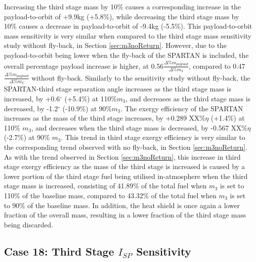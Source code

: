 Increasing the third stage mass by 10\% causes a corresponding increase in the payload-to-orbit of +9.9kg (+5.8\%), while decreasing the third stage mass by 10\% causes a decrease in payload-to-orbit of -9.4kg (-5.5\%). 
This payload-to-orbit mass sensitivity is very similar when compared to the third stage mass sensitivity study without fly-back, in Section \ref{sec:m3noReturn}. However, due to the payload-to-orbit being lower when the fly-back of the SPARTAN is included, the overall percentage payload increase is higher, at 0.56$\frac{\Delta\%m_{payload}}{\Delta\%m_3}$, compared to 0.47$\frac{\Delta\%m_{payload}}{\Delta\%m_3}$ without fly-back. 
Similarly to the sensitivity study without fly-back, the SPARTAN-third stage separation angle increases as the third stage mass is increased, by +0.6$^\circ$ (+5.4\%) at 110\%$m_3$, and decreases as the third stage mass is decreased, by -1.2$^\circ$ (-10.9\%) at 90\%$m_3$. 
The exergy efficiency of the SPARTAN increases as the mass of the third stage increases, by +0.289 XX\%$\eta$ (+1.4\%) at 110\% $m_3$, and decreases when the third stage mass is decreased, by -0.567 XX\%$\eta$ (-2.7\%) at 90\% $m_3$.
This trend in third stage exergy efficiency is very similar to the corresponding trend observed with no fly-back, in Section \ref{sec:m3noReturn}.
As with the trend observed in Section \ref{sec:m3noReturn}, this increase in third stage exergy efficiency as the mass of the third stage is increased is caused by a lower portion of the third stage fuel being utilised in-atmosphere when the third stage mass is increased, consisting of 41.89\% of the total fuel when $m_3$ is set to 110\% of the baseline mass, compared to 43.32\% of the total fuel when $m_3$ is set to 90\% of the baseline mass. 
In addition, the heat shield is once again a lower fraction of the overall mass, resulting in a lower fraction of the third stage mass being discarded. 

\subsection{Case 18: Third Stage $I_{SP}$ Sensitivity}


